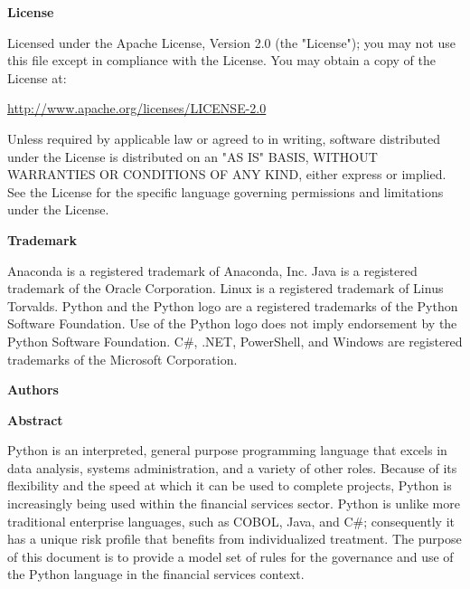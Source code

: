 \thispagestyle{empty}

\COPYRIGHT

\textbf{License}

Licensed under the Apache License, Version 2.0 (the "License"); you may not use this file except in compliance with the License. You may obtain a copy of the License at:

\url{http://www.apache.org/licenses/LICENSE-2.0}

Unless required by applicable law or agreed to in writing, software distributed under the License is distributed on an "AS IS" BASIS, WITHOUT WARRANTIES OR CONDITIONS OF ANY KIND, either express or implied. See the License for the specific language governing permissions and limitations under the License.

\textbf{Trademark}

Anaconda is a registered trademark of Anaconda, Inc. Java is a registered trademark of the Oracle Corporation. Linux is a registered trademark of Linus Torvalds. Python and the Python logo are a registered trademarks of the Python Software Foundation. Use of the Python logo does not imply endorsement by the Python Software Foundation. C\#, .NET, PowerShell, and Windows are registered trademarks of the Microsoft Corporation.

\textbf{Authors}

\AUTHORS

\textbf{Abstract}

Python is an interpreted, general purpose programming language that excels in data analysis, systems administration, and a variety of other roles. Because of its flexibility and the speed at which it can be used to complete projects, Python is increasingly being used within the financial services sector. Python is unlike more traditional enterprise languages, such as COBOL, Java, and C\#; consequently it has a unique risk profile that benefits from individualized treatment. The purpose of this document is to provide a model set of rules for the governance and use of the Python language in the financial services context.
